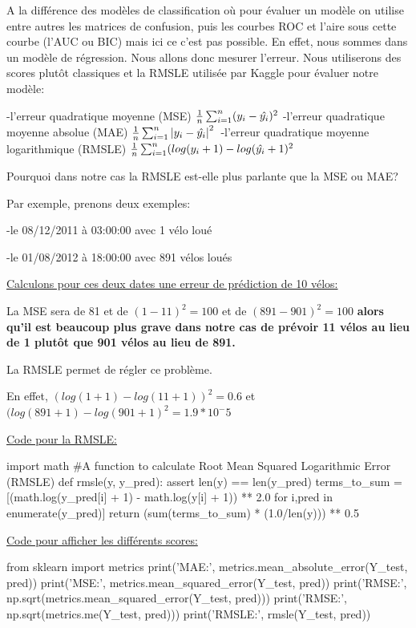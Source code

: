 \documentclass[a4paper,oneside,11pt]{article}
\begin{document}
\qquad A la différence des modèles de classification où pour évaluer un modèle on utilise entre autres les matrices de confusion, puis les courbes ROC et l'aire sous cette courbe (l'AUC ou BIC) mais ici ce c'est pas possible. En effet, nous sommes dans un modèle de régression. Nous allons donc mesurer l'erreur.
Nous utiliserons des scores plutôt classiques et la RMSLE utilisée par Kaggle pour évaluer notre modèle:

-l'erreur quadratique moyenne (MSE) $\frac{1}{n}\sum_{i=1}^{n}(y_i-\hat{y_i})^2 \newline$
-l'erreur quadratique moyenne absolue (MAE)  $\frac{1}{n}\sum_{i=1}^{n}\left|y_i-\hat{y_i}\right|^2 \newline$
-l'erreur quadratique moyenne logarithmique (RMSLE) $\frac{1}{n}\sum_{i=1}^{n}(log(y_i+1)-log(\hat{y_i}+1)^2 \newline$

Pourquoi dans notre cas la RMSLE est-elle plus parlante que la MSE ou MAE?

Par exemple, prenons deux exemples:

-le 08/12/2011 à 03:00:00 avec 1 vélo loué

-le 01/08/2012 à 18:00:00 avec 891 vélos loués

\underline{Calculons pour ces deux dates une erreur de prédiction de 10 vélos:}

La MSE sera de 81 et de $(1-11)^2=100$ et de $(891-901)^2=100$ \textbf{ alors qu'il est beaucoup plus grave dans notre cas de prévoir 11 vélos au lieu de 1 plutôt que 901 vélos au lieu de 891.}

La RMSLE permet de régler ce problème.

En effet, $(log(1+1)-log(11+1))^2=0.6$ et $(log(891+1)-log(901+1)^2=1.9*10^-5$

\underline{Code pour la RMSLE:}
\begin{code-Python}
import math
#A function to calculate Root Mean Squared Logarithmic Error (RMSLE)
def rmsle(y, y_pred):
    assert len(y) == len(y_pred)
    terms_to_sum = [(math.log(y_pred[i] + 1) - math.log(y[i] + 1)) ** 2.0 for i,pred in enumerate(y_pred)]
    return (sum(terms_to_sum) * (1.0/len(y))) ** 0.5
\end{code-Python}

\underline{Code pour afficher les différents scores:}
\begin{code-Python}
from sklearn import metrics
print('MAE:', metrics.mean_absolute_error(Y_test, pred))
print('MSE:', metrics.mean_squared_error(Y_test, pred))
print('RMSE:', np.sqrt(metrics.mean_squared_error(Y_test, pred)))
print('RMSE:', np.sqrt(metrics.me(Y_test, pred)))
print('RMSLE:', rmsle(Y_test, pred))
\end{code-Python}
\newpage
\end{document}
